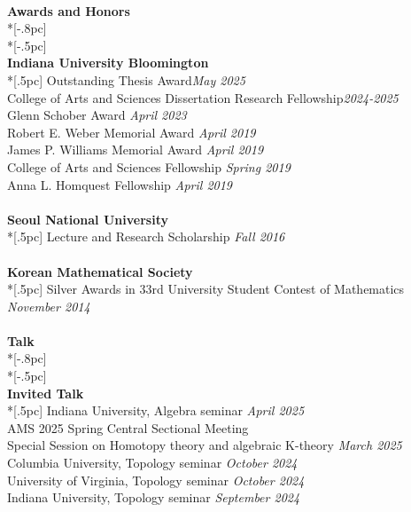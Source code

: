 \documentclass{article}
\begin{document}
\\ 
{\Large \bf Awards and Honors} \\*[-.8pc]
\underline{\hspace{6.5in}} \\*[-.5pc]
\\
{\bf \large Indiana University Bloomington} \\*[.5pc]
{Outstanding Thesis Award}\hfill {\it May 2025\/} \\
{College of Arts and Sciences Dissertation Research Fellowship}\hfill {\it 2024-2025\/} \\
{ Glenn Schober Award} \hfill {\it April 2023\/} \\
{ Robert E. Weber Memorial Award} \hfill {\it April 2019\/} \\
{  James P. Williams Memorial Award} \hfill {\it April 2019\/} \\
{ College of Arts and Sciences Fellowship} \hfill {\it Spring 2019\/} \\
{ Anna L. Homquest Fellowship} \hfill {\it April 2019\/} \\
\\
{\bf \large Seoul National University} \\*[.5pc]
{Lecture and Research Scholarship} \hfill {\it Fall 2016\/} \\
\\
{\bf \large Korean Mathematical Society} \\*[.5pc]
Silver Awards in 33rd University Student Contest of Mathematics \hfill {\it November 2014\/}  \\
\\
{\Large \bf Talk} \\*[-.8pc]
\underline{\hspace{6.5in}} \\*[-.5pc]
\\
{\bf  \large Invited Talk} \\*[.5pc]
{ Indiana University, Algebra seminar} \hfill {\it April 2025\/}  \\
{  AMS 2025 Spring Central Sectional Meeting \\ \hspace*{1em} Special Session on Homotopy theory and algebraic K-theory} \hfill {\it March 2025\/}  \\
{  Columbia University, Topology seminar} \hfill {\it October 2024\/}  \\
{  University of Virginia, Topology seminar} \hfill {\it October 2024\/}  \\
{ Indiana University, Topology seminar} \hfill {\it September 2024\/}  \\
\end{document}
